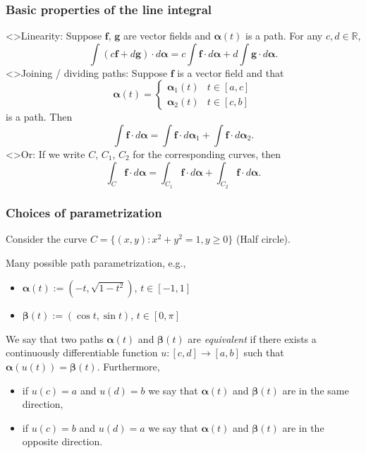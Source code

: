 \documentclass[aspectratio=169,handout]{beamer}
\newcommand{\bR}{\mathbb{R}} %
\newcommand{\ff}{\mathbf{f}}
\renewcommand{\gg}{\mathbf{g}}
\newcommand{\aalpha}{\boldsymbol{\alpha}}
\newcommand{\bbeta}{\boldsymbol{\beta}}
\begin{document}
\begin{frame}
    \frametitle{Basic properties of the line integral}
    \structure<>{Linearity:}
    Suppose \(\ff\), \(\gg\) are vector fields and \(\aalpha(t)\) is a path. For any \(c,d\in \bR\),
    \[
        \int (c\ff + d\gg) \cdot d\aalpha =  c \int \ff  \cdot d\aalpha +  d \int \gg \cdot d\aalpha.
    \]
    \structure<>{Joining / dividing paths:}
    Suppose \(\ff\) is a vector field and that
    \[
        \aalpha(t) = \begin{cases}
            \aalpha_1(t) & t\in [a,c] \\
            \aalpha_2(t) & t\in [c,b]
        \end{cases}
    \]
    is a path.
    Then
    \[
        \int \ff  \cdot d\aalpha = \int \ff  \cdot d\aalpha_1  + \int \ff  \cdot d\aalpha_2.
    \]
    \structure<>{Or:}
    If we write \(C\), \(C_1\), \(C_2\) for the corresponding curves, then
    \[
        \int_{C} \ff  \cdot d\aalpha = \int_{C_1} \ff  \cdot d\aalpha + \int_{C_2} \ff  \cdot d\aalpha.
    \]


\end{frame}



\begin{frame}
    \frametitle{Choices of parametrization}

    Consider the curve \(C = \{(x,y) : x^2 + y^2 = 1, y\geq 0\}\) (Half circle).

    Many possible path parametrization, e.g.,

    \begin{itemize}
        \item     \(\aalpha(t):= ( -t , \sqrt{1-t^2})\), \(t\in [-1,1]\)
        \item  \(\bbeta(t) := (\cos t, \sin t)\), \(t\in [0,\pi]\)
    \end{itemize}


    \begin{definition}
        We say that two paths \(\aalpha(t)\) and \(\bbeta(t)\) are \emph{equivalent} if there exists a continuously differentiable function \(u : [c,d] \to [a,b] \) such that \(\aalpha(u(t)) = \bbeta(t)\).
        Furthermore,
        \begin{itemize}
            \item if \(u(c)=a\) and \(u(d)=b\) we say that  \(\aalpha(t)\) and \(\bbeta(t)\) are in the same direction,
            \item if \(u(c)=b\) and \(u(d)=a\) we say that  \(\aalpha(t)\) and \(\bbeta(t)\) are in the opposite direction.
        \end{itemize}
    \end{definition}


\end{frame}
\end{document}
